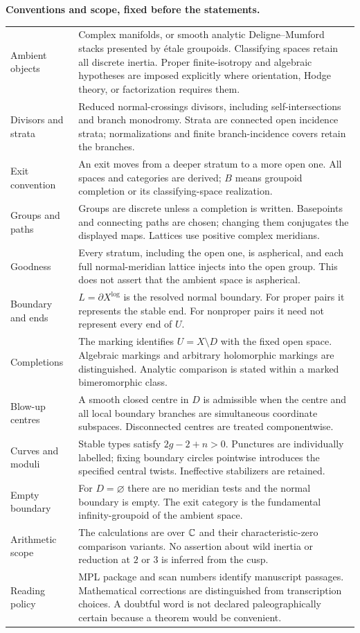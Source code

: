 \noindent\textbf{Conventions and scope, fixed before the statements.}
\begin{center}\small
\renewcommand{\arraystretch}{1.11}
\begin{tabularx}{\textwidth}{@{}p{}X@{}}
\toprule
Ambient objects&Complex manifolds, or smooth analytic Deligne--Mumford stacks presented by étale groupoids. Classifying spaces retain all discrete inertia. Proper finite-isotropy and algebraic hypotheses are imposed explicitly where orientation, Hodge theory, or factorization requires them.\\
Divisors and strata&Reduced normal-crossings divisors, including self-intersections and branch monodromy. Strata are connected open incidence strata; normalizations and finite branch-incidence covers retain the branches.\\
Exit convention&An exit moves from a deeper stratum to a more open one. All spaces and categories are derived; $B$ means groupoid completion or its classifying-space realization.\\
Groups and paths&Groups are discrete unless a completion is written. Basepoints and connecting paths are chosen; changing them conjugates the displayed maps. Lattices use positive complex meridians.\\
Goodness&Every stratum, including the open one, is aspherical, and each full normal-meridian lattice injects into the open group. This does not assert that the ambient space is aspherical.\\
Boundary and ends&$L=\partial X^{\log}$ is the resolved normal boundary. For proper pairs it represents the stable end. For nonproper pairs it need not represent every end of $U$.\\
Completions&The marking identifies $U=X\setminus D$ with the fixed open space. Algebraic markings and arbitrary holomorphic markings are distinguished. Analytic comparison is stated within a marked bimeromorphic class.\\
Blow-up centres&A smooth closed centre in $D$ is admissible when the centre and all local boundary branches are simultaneous coordinate subspaces. Disconnected centres are treated componentwise.\\
Curves and moduli&Stable types satisfy $2g-2+n>0$. Punctures are individually labelled; fixing boundary circles pointwise introduces the specified central twists. Ineffective stabilizers are retained.\\
Empty boundary&For $D=\varnothing$ there are no meridian tests and the normal boundary is empty. The exit category is the fundamental infinity-groupoid of the ambient space.\\
Arithmetic scope&The calculations are over $\mathbb C$ and their characteristic-zero comparison variants. No assertion about wild inertia or reduction at $2$ or $3$ is inferred from the cusp.\\
Reading policy&MPL package and scan numbers identify manuscript passages. Mathematical corrections are distinguished from transcription choices. A doubtful word is not declared paleographically certain because a theorem would be convenient.\\
\bottomrule
\end{tabularx}
\end{center}
